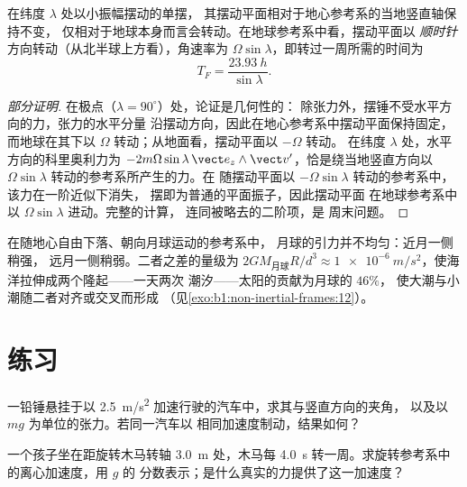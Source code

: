 \begin{proposition}[傅科摆]\label{prop:b1:non-inertial-frames:foucault}
在纬度 $\lambda$ 处以小振幅摆动的单摆，
其摆动平面相对于地心参考系的当地竖直轴保持不变，
仅相对于地球本身而言会转动。在地球参考系中看，摆动平面以
\emph{顺时针}方向转动（从北半球上方看），角速率为
$\Omega\sin\lambda$，即转过一周所需的时间为
\[
T_F = \frac{\qty{23.93}{h}}{\sin\lambda} .
\]
\end{proposition}

\begin{proof}[部分证明]
在极点（$\lambda = 90^\circ$）处，论证是几何性的：
除张力外，摆锤不受水平方向的力，张力的水平分量
沿摆动方向，因此在地心参考系中摆动平面保持固定，
而地球在其下以 $\Omega$ 转动；从地面看，摆动平面以 $-\Omega$ 转动。
在纬度 $\lambda$ 处，水平方向的科里奥利力为
$-2m\Omega\sin\lambda\,\vect e_z\wedge\vect v'$，恰是绕当地竖直方向以
$\Omega\sin\lambda$ 转动的参考系所产生的力。在
随摆动平面以 $-\Omega\sin\lambda$ 转动的参考系中，该力在一阶近似下消失，
摆即为普通的平面振子，因此摆动平面
在地球参考系中以 $\Omega\sin\lambda$ 进动。完整的计算，
连同被略去的二阶项，是
周末问题。
\end{proof}

\begin{remark}[两句话说清潮汐]\label{rem:b1:non-inertial-frames:tides}
在随地心自由下落、朝向月球运动的参考系中，
月球的引力并不均匀：近月一侧稍强，
远月一侧稍弱。二者之差的量级为 $2GM_{\text{月球}}R/d^3
\approx \qty{1e-6}{m/s^2}$，使海洋拉伸成两个隆起——一天两次
潮汐——太阳的贡献为月球的 $46\%$，
使大潮与小潮随二者对齐或交叉而形成
（见\cref{exo:b1:non-inertial-frames:12}）。
\end{remark}

\section{练习}

\begin{exercise}[$\star$]\label{exo:b1:non-inertial-frames:1}
一铅锤悬挂于以 \qty{2.5}{m/s^2} 加速行驶的汽车中，求其与竖直方向的夹角，
以及以 $mg$ 为单位的张力。若同一汽车以
相同加速度制动，结果如何？
\end{exercise}

\begin{exercise}[$\star$]\label{exo:b1:non-inertial-frames:2}
一个孩子坐在距旋转木马转轴 \qty{3.0}{m} 处，木马每
\qty{4.0}{s} 转一周。求旋转参考系中的离心加速度，用 $g$ 的
分数表示；是什么真实的力提供了这一加速度？
\end{exercise}

